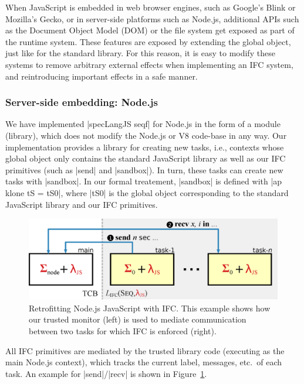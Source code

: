 When JavaScript is embedded in web browser engines, such as Google's
Blink or Mozilla's Gecko, or in server-side platforms such as Node.js,
additional APIs such as the Document Object Model (DOM) or the file
system get exposed as part of the runtime system.
These features are exposed by extending the global object, just like
for the standard library.  For this reason, it is easy to modify
these systems to remove arbitrary external effects when implementing
an IFC system, and reintroducing important effects in a safe manner.


\subsubsection{Server-side embedding: Node.js}

We have implemented |specLangJS seqf| for Node.js in the form of a module
(library), which does not modify the Node.js or V8 code-base in any
way.
%
Our implementation provides a library for creating new tasks, i.e.,
contexts whose global object only contains the standard JavaScript
library as well as our IFC primitives (such as |send| and |sandbox|).
%
In turn, these tasks can create new tasks with |sandbox|.
%
In our formal treatement, |sandbox| is defined with |ap klone tS = tS0|,
where |tS0| is the global object corresponding to the standard
JavaScript library and our IFC primitives.
 
\begin{figure}
\centerline{\includegraphics[width=\columnwidth]{figs/node}}
\caption{\label{fig:node} Retrofitting Node.js JavaScript with IFC.
This example shows how our trusted monitor (left) is used to mediate
communication between two tasks for which IFC is enforced (right).}
\end{figure}
%
All IFC primitives are mediated by the trusted library code (executing
as the main Node.js context), which tracks the current label, messages,
etc.\ of each task.  An example for |send|/|recv| is shown in
Figure~\ref{fig:node}.

